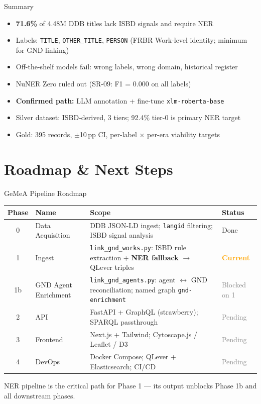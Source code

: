 \documentclass[xcolor,aspectratio=169,compress]{beamer}
\begin{document}
\begin{frame}{Summary}
  \small
  \begin{itemize}\setlength{\itemsep}{3pt}
    \item \textbf{71.6\%} of 4.48M DDB titles lack ISBD signals and require NER
    \item Labels: \texttt{TITLE}, \texttt{OTHER\_TITLE}, \texttt{PERSON} (FRBR Work-level identity; minimum for GND linking)
    \item Off-the-shelf models fail: wrong labels, wrong domain, historical register
    \item NuNER Zero ruled out (SR-09: F1 = 0.000 on all labels)
    \item \textbf{Confirmed path:} LLM annotation + fine-tune \texttt{xlm-roberta-base}
    \item Silver dataset: ISBD-derived, 3 tiers; 92.4\% tier-0 is primary NER target
    \item Gold: 395 records, $\pm$10\,pp CI, per-label $\times$ per-era viability targets
  \end{itemize}
  \normalsize
\end{frame}

\section{Roadmap \& Next Steps}

\begin{frame}{GeMeA Pipeline Roadmap}
  \footnotesize
  \begin{tabular}{clp{6cm}l}
    \toprule
    Phase & Name & Scope & Status \\
    \midrule
    0  & Data Acquisition     & DDB JSON-LD ingest; \texttt{langid} filtering; ISBD signal analysis & \textcolor{green!60!black}{Done} \\
    1  & Ingest               & \texttt{link\_gnd\_works.py}: ISBD rule extraction + \textbf{NER fallback} $\to$ QLever triples & \textcolor{orange}{\textbf{Current}} \\
    1b & GND Agent Enrichment & \texttt{link\_gnd\_agents.py}: agent $\leftrightarrow$ GND reconciliation; named graph \texttt{gnd-enrichment} & \textcolor{gray}{Blocked on 1} \\
    2  & API                  & FastAPI + GraphQL (strawberry); SPARQL passthrough & \textcolor{gray}{Pending} \\
    3  & Frontend             & Next.js + Tailwind; Cytoscape.js / Leaflet / D3 & \textcolor{gray}{Pending} \\
    4  & DevOps               & Docker Compose; QLever + Elasticsearch; CI/CD & \textcolor{gray}{Pending} \\
    \bottomrule
  \end{tabular}
  \smallskip
  \normalsize
  \begin{block}{}
    \small\raggedright NER pipeline is the critical path for Phase 1 --- its output unblocks Phase 1b and all downstream phases.
  \end{block}
\end{frame}
\end{document}
